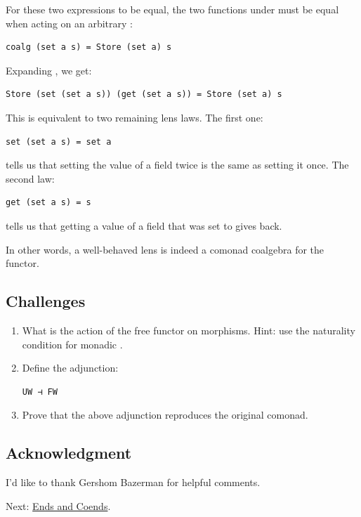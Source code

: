 For these two expressions to be equal, the two functions under
 must be equal when acting on an arbitrary :

\begin{verbatim}
coalg (set a s) = Store (set a) s
\end{verbatim}

Expanding , we get:

\begin{verbatim}
Store (set (set a s)) (get (set a s)) = Store (set a) s
\end{verbatim}

This is equivalent to two remaining lens laws. The first one:

\begin{verbatim}
set (set a s) = set a
\end{verbatim}

tells us that setting the value of a field twice is the same as setting
it once. The second law:

\begin{verbatim}
get (set a s) = s
\end{verbatim}

tells us that getting a value of a field that was set to 
gives  back.

In other words, a well-behaved lens is indeed a comonad coalgebra for
the  functor.

\subsection{Challenges}\label{challenges}

\begin{enumerate}
\item
  What is the action of the free functor
   on morphisms. Hint: use the
  naturality condition for monadic .
\item
  Define the adjunction:

\begin{verbatim}
UW ⊣ FW
\end{verbatim}
\item
  Prove that the above adjunction reproduces the original comonad.
\end{enumerate}

\subsection{Acknowledgment}\label{acknowledgment}

I'd like to thank Gershom Bazerman for helpful comments.

Next:
\href{https://bartoszmilewski.com/2017/03/29/ends-and-coends/}{Ends and
Coends}.
